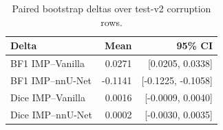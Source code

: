 \begin{table}[t]
\centering
\caption{Paired bootstrap deltas over test-v2 corruption rows.}
\label{tab:bootstrap}
\begin{tabular}{lrr}
\toprule
Delta & Mean & 95\% CI \\
\midrule
BF1 IMP--Vanilla & 0.0271 & [0.0205, 0.0338] \\
BF1 IMP--nnU-Net & -0.1141 & [-0.1225, -0.1058] \\
Dice IMP--Vanilla & 0.0016 & [-0.0009, 0.0040] \\
Dice IMP--nnU-Net & 0.0002 & [-0.0030, 0.0035] \\
\bottomrule
\end{tabular}
\end{table}
